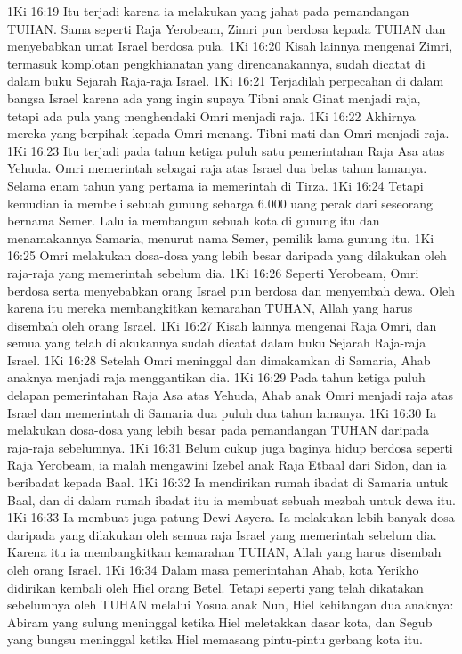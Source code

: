 1Ki 16:19  Itu terjadi karena ia melakukan yang jahat pada pemandangan TUHAN. Sama seperti Raja Yerobeam, Zimri pun berdosa kepada TUHAN dan menyebabkan umat Israel berdosa pula.
1Ki 16:20  Kisah lainnya mengenai Zimri, termasuk komplotan pengkhianatan yang direncanakannya, sudah dicatat di dalam buku Sejarah Raja-raja Israel.
1Ki 16:21  Terjadilah perpecahan di dalam bangsa Israel karena ada yang ingin supaya Tibni anak Ginat menjadi raja, tetapi ada pula yang menghendaki Omri menjadi raja.
1Ki 16:22  Akhirnya mereka yang berpihak kepada Omri menang. Tibni mati dan Omri menjadi raja.
1Ki 16:23  Itu terjadi pada tahun ketiga puluh satu pemerintahan Raja Asa atas Yehuda. Omri memerintah sebagai raja atas Israel dua belas tahun lamanya. Selama enam tahun yang pertama ia memerintah di Tirza.
1Ki 16:24  Tetapi kemudian ia membeli sebuah gunung seharga 6.000 uang perak dari seseorang bernama Semer. Lalu ia membangun sebuah kota di gunung itu dan menamakannya Samaria, menurut nama Semer, pemilik lama gunung itu.
1Ki 16:25  Omri melakukan dosa-dosa yang lebih besar daripada yang dilakukan oleh raja-raja yang memerintah sebelum dia.
1Ki 16:26  Seperti Yerobeam, Omri berdosa serta menyebabkan orang Israel pun berdosa dan menyembah dewa. Oleh karena itu mereka membangkitkan kemarahan TUHAN, Allah yang harus disembah oleh orang Israel.
1Ki 16:27  Kisah lainnya mengenai Raja Omri, dan semua yang telah dilakukannya sudah dicatat dalam buku Sejarah Raja-raja Israel.
1Ki 16:28  Setelah Omri meninggal dan dimakamkan di Samaria, Ahab anaknya menjadi raja menggantikan dia.
1Ki 16:29  Pada tahun ketiga puluh delapan pemerintahan Raja Asa atas Yehuda, Ahab anak Omri menjadi raja atas Israel dan memerintah di Samaria dua puluh dua tahun lamanya.
1Ki 16:30  Ia melakukan dosa-dosa yang lebih besar pada pemandangan TUHAN daripada raja-raja sebelumnya.
1Ki 16:31  Belum cukup juga baginya hidup berdosa seperti Raja Yerobeam, ia malah mengawini Izebel anak Raja Etbaal dari Sidon, dan ia beribadat kepada Baal.
1Ki 16:32  Ia mendirikan rumah ibadat di Samaria untuk Baal, dan di dalam rumah ibadat itu ia membuat sebuah mezbah untuk dewa itu.
1Ki 16:33  Ia membuat juga patung Dewi Asyera. Ia melakukan lebih banyak dosa daripada yang dilakukan oleh semua raja Israel yang memerintah sebelum dia. Karena itu ia membangkitkan kemarahan TUHAN, Allah yang harus disembah oleh orang Israel.
1Ki 16:34  Dalam masa pemerintahan Ahab, kota Yerikho didirikan kembali oleh Hiel orang Betel. Tetapi seperti yang telah dikatakan sebelumnya oleh TUHAN melalui Yosua anak Nun, Hiel kehilangan dua anaknya: Abiram yang sulung meninggal ketika Hiel meletakkan dasar kota, dan Segub yang bungsu meninggal ketika Hiel memasang pintu-pintu gerbang kota itu.
